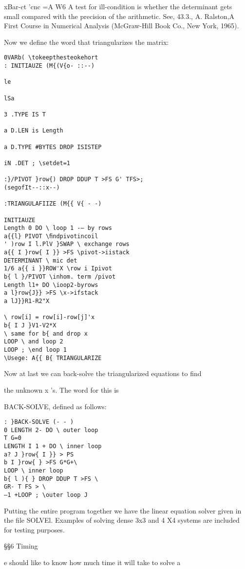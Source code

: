 {{{{{{{{{xBar-ct 'cnc =A W6
A test for ill-condition is whether the determinant gets small compared with the precision of the
arithmetic. See, 43.3., A. Ralston,A First Course in Numerical Analysis (McGraw-Hill Book Co.,
New York, 1965).


Now we deﬁne the word that triangularizes the matrix:
\begin{verbatim}
0VARb( \tokeepthesteokehort
: INITIAUZE (M{(V{o- ::--)

le

lSa

3 .TYPE IS T

a D.LEN is Length

a D.TYPE #BYTES DROP ISISTEP

iN .DET ; \setdet=1

:}/PIVOT }row{) DROP DDUP T >FS G' TFS>;
(segofIt--::x--)

:TRIANGULAFIIZE (M{{ V{ - -)

INITIAUZE
Length 0 DO \ loop 1 -— by rows
a{{l} PIVOT \ﬁndpivotincoil
' )row I l.PlV }SWAP \ exchange rows
a{{ I }row{ I }} >FS \pivot->iistack
DETERMINANT \ mic det
1/6 a{{ i }}ROW'X \row i Ipivot
b{ l }/PIVOT \inhom. term /pivot
Length l1+ DO \ioop2-byrows
a l}row{J}} >FS \x->ifstack
a lJ}}R1-R2"X

\ row[i] = row[i]-row[j]'x
b{ I J }V1-V2*X
\ same for b{ and drop x
LOOP \ and loop 2
LOOP ; \end loop 1
\Usege: A{{ B{ TRIANGULARIZE
\end{verbatim}

Now at last we can back-solve the triangularized equations to ﬁnd

the unknown x 's. The word for this is }BACK-SOLVE, deﬁned
as follows:


\begin{verbatim}
: }BACK-SOLVE (- - )
0 LENGTH 2- DO \ outer loop
T G=0
LENGTH I 1 + DO \ inner loop
a? J }row{ I }} > PS
b I }row{ } >FS G*G+\
LOOP \ inner loop
b{ l ){ } DROP DDUP T >FS \
GR- T FS > \
—1 +LOOP ; \outer loop J
\end{verbatim} 

Putting the entire program together we have the linear equation
solver given in the ﬁle SOLVEl. Examples of solving dense 3x3
and 4 X4 systems are included for testing purposes.

\S\S6 Timing

e should like to know how much time it will take to solve a

}}}}}}}}

